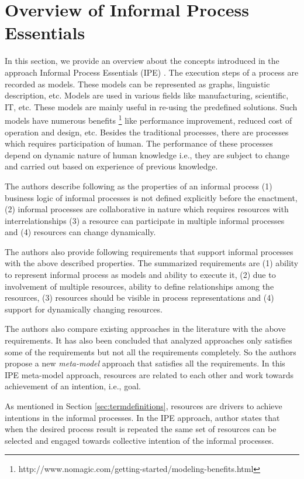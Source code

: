 \section{Overview of Informal Process Essentials}
\label{sec:basicconcepts}
In this section, we provide an overview about the concepts introduced in the approach Informal Process Essentials (IPE) \cite{Sungur2014a}. The execution steps of a process are recorded as models. These models can be represented as graphs, linguistic description, etc. Models are used in various fields like manufacturing, scientific, IT, etc. These models are mainly useful in re-using the predefined solutions. Such models have numerous benefits \footnote{http://www.nomagic.com/getting-started/modeling-benefits.html} like performance improvement, reduced cost of operation and design, etc. Besides the traditional processes, there are processes which requires participation of human. The performance of these processes depend on dynamic nature of human knowledge i.e., they are subject to change and carried out based on experience of previous knowledge. 

The authors describe following as the properties of an informal process (1) business logic of informal processes is not defined explicitly before the enactment, (2) informal processes are collaborative in nature which requires resources with interrelationships (3) a resource can participate in multiple informal processes and (4) resources can change dynamically.

The authors also provide following requirements that support informal processes with the above described properties. The summarized requirements are (1) ability to represent informal process as models and ability to execute it, (2) due to involvement of multiple resources, ability to define relationships among the resources, (3) resources should be visible in process representations and (4) support for dynamically changing resources. 

The authors also compare existing approaches in the literature with the above requirements. It has also been concluded that analyzed approaches only satisfies some of the requirements but not all the requirements completely. So the authors propose a new \textit{meta-model} approach that satisfies all the requirements. In this IPE meta-model approach, resources are related to each other and work towards achievement of an intention, i.e., goal.   

As mentioned in Section \ref{sec:termdefinitions}, resources are drivers to achieve intentions in the informal processes. In the IPE approach, author states that when the desired process result is repeated the same set of resources can be selected and engaged towards collective intention of the informal processes. 
 
